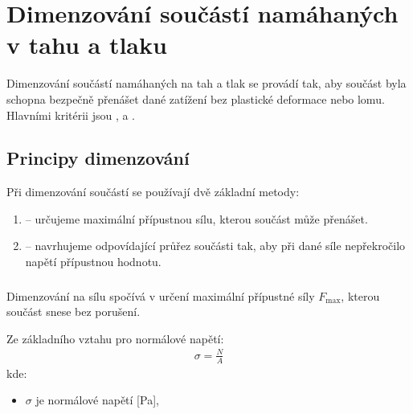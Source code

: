 \documentclass[letterpaper,10pt,english]{jupyterBook}
\begin{document}
{{\section{Dimenzování součástí namáhaných v tahu a tlaku}
\label{\detokenize{Prednasky/2_8_Dimenzovani:dimenzovani-soucasti-namahanych-v-tahu-a-tlaku}}\label{\detokenize{Prednasky/2_8_Dimenzovani::doc}}
\sphinxAtStartPar
Dimenzování součástí namáhaných na tah a tlak se provádí tak, aby součást byla schopna bezpečně přenášet dané zatížení bez plastické deformace nebo lomu. Hlavními kritérii jsou ,  a .


\subsection{Principy dimenzování}
\label{\detokenize{Prednasky/2_8_Dimenzovani:principy-dimenzovani}}
\sphinxAtStartPar
Při dimenzování součástí se používají dvě základní metody:
\begin{enumerate}
%
\item {} 
\sphinxAtStartPar
{} – určujeme maximální přípustnou sílu, kterou součást může přenášet.

\item {} 
\sphinxAtStartPar
{} – navrhujeme odpovídající průřez součásti tak, aby při dané síle nepřekročilo napětí přípustnou hodnotu.

\end{enumerate}


\subsubsection{}
\label{\detokenize{Prednasky/2_8_Dimenzovani:dimenzovani-na-zatizeni}}
\sphinxAtStartPar
Dimenzování na sílu spočívá v určení maximální přípustné síly \(F_{\text{max}}\), kterou součást snese bez porušení.

\sphinxAtStartPar
Ze základního vztahu pro normálové napětí:
\begin{equation*}
\begin{split}
\sigma = \frac{N}{A}
\end{split}
\end{equation*}
\sphinxAtStartPar
kde:
\begin{itemize}
\item {} 
\sphinxAtStartPar
\(\sigma\) je normálové napětí {[}Pa{]},


\end{itemize}}}
\end{document}
